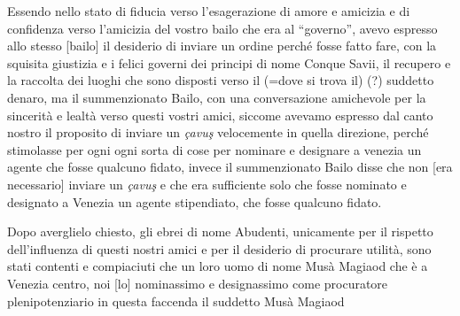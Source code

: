 Essendo  nello  stato  di  fiducia  verso l'esagerazione  di  amore  e
amicizia e di confidenza verso  l'amicizia del vostro bailo che era al
``governo'',  avevo  espresso  allo  stesso [bailo]  il  desiderio  di
inviare un ordine perché fosse fatto fare, con la squisita giustizia e
i felici governi  dei principi di nome Conque Savii,  il recupero e la
raccolta dei luoghi che sono disposti verso il (=dove si trova il) (?)
suddetto  denaro, ma  il  summenzionato Bailo,  con una  conversazione
amichevole  per  la sincerità  e  lealtà  verso  questi vostri  amici,
siccome avevamo espresso  dal canto nostro il proposito  di inviare un
{\it  çavuş} velocemente  in quella  direzione, perché  stimolasse per
ogni ogni sorta  di cose per nominare e designare  a venezia un agente
che fosse qualcuno fidato, invece il summenzionato Bailo disse che non
[era necessario] inviare un {\it çavuş} e che era sufficiente solo che
fosse nominato e designato a  Venezia un agente stipendiato, che fosse
qualcuno fidato.

Dopo averglielo chiesto, gli ebrei di nome Abudenti, unicamente per il
rispetto dell'influenza di  questi nostri amici e per  il desiderio di
procurare utilità, sono stati contenti  e compiaciuti che un loro uomo
di nome  Musà Magiaod che è  a Venezia centro, noi  [lo] nominassimo e
designassimo come  procuratore plenipotenziario in  questa faccenda il
suddetto Musà Magiaod
